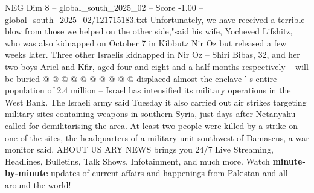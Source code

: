 \begin{textsample}{NEG Dim 8 – global\_south\_2025\_02 – Score -1.00 – global\_south\_2025\_02/121715183.txt}
Unfortunately, we have received a terrible blow from those we helped on the other side,"said his wife, Yocheved Lifshitz, who was also kidnapped on October 7 in Kibbutz Nir Oz but released a few weeks later.
Three other Israelis kidnapped in Nir Oz -- Shiri Bibas, 32, and her two boys Ariel and Kfir, aged four and eight and a half months respectively -- will be buried @ @ @ @ @ @ @ @ @ @ displaced almost the enclave ' s entire population of 2.4 million -- Israel has intensified its military operations in the West Bank.
The Israeli army said Tuesday it also carried out air strikes targeting military sites containing weapons in southern Syria, just days after Netanyahu called for demilitarising the area.
At least two people were killed by a strike on one of the sites, the headquarters of a military unit southwest of Damascus, a war monitor said.
ABOUT US ARY NEWS brings you 24/7 Live Streaming, Headlines, Bulletins, Talk Shows, Infotainment, and much more.
Watch \textbf{minute-by-minute} updates of current affairs and happenings from Pakistan and all around the world!

\end{textsample}
